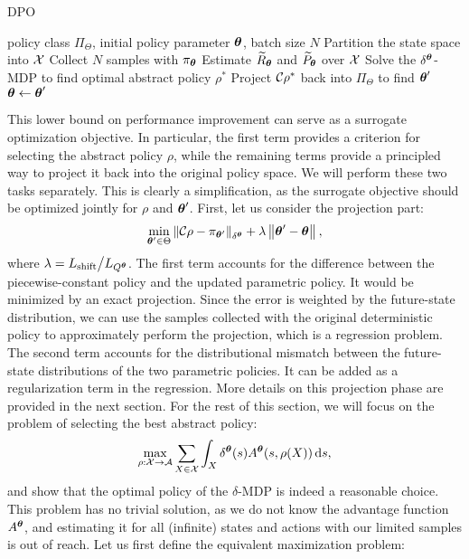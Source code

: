 %
%
\begin{algorithm}[t]
	\caption{DPO}
	\label{alg:dpo}
	\begin{algorithmic}[1]
		 policy class $\Pi_{\Theta}$, initial policy parameter $\vtheta$, batch size $N$
		\STATE Partition the state space into $\Xspace$
		\STATE Collect $N$ samples with $\pi_{\vtheta}$ 
		\STATE Estimate $\wt{R}_{\vtheta}$ and $\wt{P}_{\vtheta}$ over $\Xspace$
		\STATE Solve the $\delta^{\vtheta}$-MDP to find optimal abstract policy $\rho^{*}$
		\STATE Project $\Conc\rho^{*}$ back into $\Pi_{\Theta}$ to find $\vtheta'$
		\STATE $\vtheta\gets\vtheta'$
		\ENDFOR
	\end{algorithmic}
\end{algorithm}
%
This lower bound on performance improvement can serve as a surrogate optimization objective. In particular, the first term provides a criterion for selecting the abstract policy $\rho$, while the remaining terms provide a principled way to project it back into the original policy space. 
We will perform these two tasks separately. This is clearly a simplification, as the surrogate objective should be optimized jointly for $\rho$ and $\vtheta'$. 
First, let us consider the projection part: 
\begin{align}\label{eq:proj}
	\min_{\vtheta'\in\Theta} \norm[\delta^{\vtheta}]{\Conc\rho - \pi_{\vtheta'}} 
	+ \lambda\norm{\vtheta'-\vtheta},
\end{align}
where $\lambda=L_{\text{shift}}\big/L_{Q^{\vtheta}}$. The first term accounts for the difference between the piecewise-constant policy and the updated parametric policy. It would be minimized by an exact projection. Since the error is weighted by the future-state distribution, we can use the samples collected with the original deterministic policy to approximately perform the projection, which is a regression problem. The second term accounts for the distributional mismatch between the future-state distributions of the two parametric policies. It can be added as a regularization term in the regression. More details on this projection phase are provided in the next section.
%
For the rest of this section, we will focus on the problem of selecting the best abstract policy: 
%
\begin{align}
\max_{\rho:\Xspace\to\Aspace}\sum_{X\in\Xspace}\int_{X}\delta^{\vtheta}(s)A^{\vtheta}(s,\rho(X)) \de s,
\end{align}
%
and show that the optimal policy of the $\delta$-MDP is indeed a reasonable choice. This problem has no trivial solution, as we do not know the advantage function $A^{\vtheta}$, and estimating it for all (infinite) states and actions with our limited samples is out of reach. Let us first define the equivalent maximization problem:

